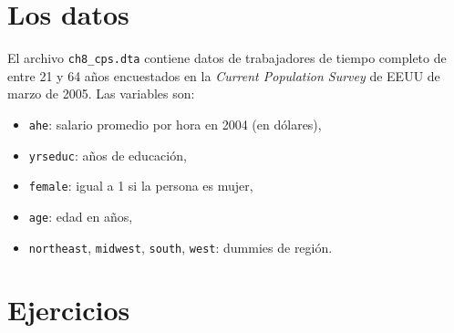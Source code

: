 \documentclass[letterpaper,11pt]{article}
\begin{document}
\section*{Los datos}

\noindent El archivo \texttt{ch8\_cps.dta} contiene datos de trabajadores de tiempo completo de
entre 21 y 64 años encuestados en la \emph{Current Population Survey} de EEUU de marzo de 2005.
Las variables son:
\begin{itemize}[itemsep=0em]
    \item \texttt{ahe}: salario promedio por hora en 2004 (en dólares),
    \item \texttt{yrseduc}: años de educación,
    \item \texttt{female}: igual a 1 si la persona es mujer,
    \item \texttt{age}: edad en años,
    \item \texttt{northeast}, \texttt{midwest}, \texttt{south}, \texttt{west}: dummies de región.
\end{itemize}

\section*{Ejercicios}
\end{document}
